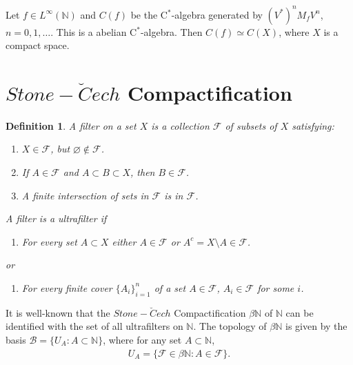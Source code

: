 \documentclass[a4paper,10pt]{amsart}
\newtheorem{definition}{Definition}[section]
\newcommand{\FFF}{\mathcal F}
\newcommand{\N}{\mathbb N} %
\begin{document}
Let $f \in L^{\infty}(\N)$ and $C(f)$ be the C$^*$-algebra generated
by $(V^{*})^{n}M_{f}V^{n}$, $n = 0, 1, \ldots$. This is a abelian 
C$^*$-algebra. Then $C(f) \simeq C(X)$, where $X$ is a compact 
space.
    

    
\section{$Stone-\breve{C}ech$ Compactification}

\begin{definition}
   A filter on a set $X$ is a collection $\FFF$ of subsets of $X$
   satisfying:
   \begin{enumerate}
       \item $X \in \FFF$, but $\varnothing \notin \FFF$.
       \item If $A \in \FFF$ and $A \subset B \subset X$, then 
           $B \in \FFF$.
       \item A finite intersection of sets in $\FFF$ is in $\FFF$.
   \end{enumerate}
   A filter is a ultrafilter if
   \begin{enumerate}[resume] 
       \item For every set $A \subset X$ either $A \in \FFF$
           or $A^{c} = X \setminus A \in \FFF$.  
   \end{enumerate}
   or
   \begin{enumerate}
    \item[(4)'] For every finite cover $\{A_{i}\}_{i=1}^{n}$ of a 
           set $A \in \FFF$, $A_{i} \in \FFF$ for some $i$.
   \end{enumerate}
\end{definition}

It is well-known that the $Stone-\breve{C}ech$ Compactification
$\beta \N$ of $\N$ can be identified with the set of all ultrafilters 
on $\N$. The topology of $\beta \N$ is given by the basis 
$\mathcal{B}= \{ U_{A}: A \subset \N\}$, where for any set $A \subset \N$,
\begin{align*}
    U_{A}=\{\FFF \in \beta \N: A \in \FFF \}. 
\end{align*}
\end{document}
